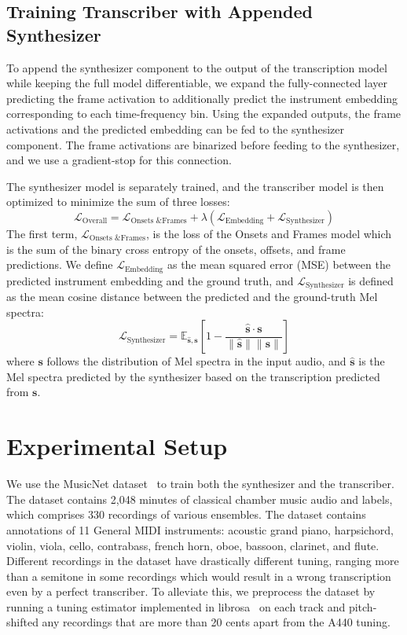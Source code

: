 \subsection{Training Transcriber with Appended Synthesizer}

To append the synthesizer component to the output of the transcription model while keeping the full model differentiable, we expand the fully-connected layer predicting the frame activation to additionally predict the instrument embedding corresponding to each time-frequency bin.
Using the expanded outputs, the frame activations and the predicted embedding can be fed to the synthesizer component.
The frame activations are binarized before feeding to the synthesizer, and we use a gradient-stop for this connection.

The synthesizer model is separately trained, and the transcriber model is then optimized to minimize the sum of three losses:
\begin{equation}
\mathcal{L}_{\text{Overall}} = \mathcal{L}_{\text{Onsets \& Frames}} + \lambda \left ( \mathcal{L}_{\text{Embedding}} + \mathcal{L}_{\text{Synthesizer}} \right )
\end{equation}
The first term, $\mathcal{L}_{\text{Onsets \& Frames}}$, is the loss of the Onsets and Frames model which is the sum of the binary cross entropy of the onsets, offsets, and frame predictions.
We define $\mathcal{L}_{\text{Embedding}}$ as the mean squared error (MSE) between the predicted instrument embedding and the ground truth, and $\mathcal{L}_{\text{Synthesizer}}$ is defined as the mean cosine distance between the predicted and the ground-truth Mel spectra:
\begin{equation}
\mathcal{L}_{\text{Synthesizer}} = \mathbb{E}_{\hat{\mathbf{s}}, \mathbf{s}} \left [ 1 - \frac{ \hat{\mathbf{s}} \cdot \mathbf{s} }{\lVert \hat{\mathbf{s}} \rVert \lVert \mathbf{s} \rVert} \right ]
\end{equation}
where $\mathbf{s}$ follows the distribution of Mel spectra in the input audio, and $\hat{\mathbf{s}}$ is the Mel spectra predicted by the synthesizer based on the transcription predicted from $\mathbf{s}$.

\section{Experimental Setup}

We use the MusicNet dataset~\cite{thickstun2017musicnet} to train both the synthesizer and the transcriber.
The dataset contains 2,048 minutes of classical chamber music audio and labels, which comprises 330 recordings of various ensembles.
The dataset contains annotations of 11 General MIDI instruments: acoustic grand piano, harpsichord, violin, viola, cello, contrabass, french horn, oboe, bassoon, clarinet, and flute.
Different recordings in the dataset have drastically different tuning, ranging more than a semitone in some recordings which would result in a wrong transcription even by a perfect transcriber.
To alleviate this, we preprocess the dataset by running a tuning estimator implemented in librosa~\cite{mcfee2015librosa} on each track and pitch-shifted any recordings that are more than 20 cents apart from the A440 tuning.

